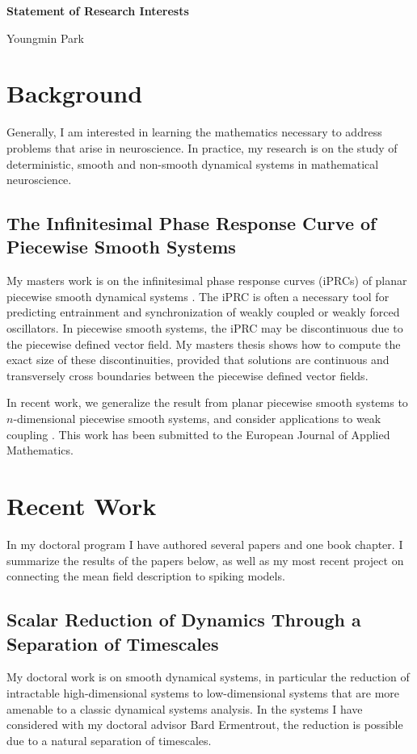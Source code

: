 \documentclass[a4paper,11pt]{article}
\begin{document}
\begin{center}
\Large \textbf{Statement of Research Interests}

\Large Youngmin Park
\end{center}


\section{Background}
Generally, I am interested in learning the mathematics necessary to address problems that arise in neuroscience. In practice, my research is on the study of deterministic, smooth and non-smooth dynamical systems in mathematical neuroscience.

\subsection{The Infinitesimal Phase Response Curve of Piecewise Smooth Systems}
My masters work is on the infinitesimal phase response curves (iPRCs) of planar piecewise smooth dynamical systems \cite{park2013infinitesimal}. The iPRC is often a necessary tool for predicting entrainment and synchronization of weakly coupled or weakly forced oscillators. In piecewise smooth systems, the iPRC may be discontinuous due to the piecewise defined vector field. My masters thesis shows how to compute the exact size of these discontinuities, provided that solutions are continuous and transversely cross boundaries between the piecewise defined vector fields.

In recent work, we generalize the result from planar piecewise smooth systems to $n$-dimensional piecewise smooth systems, and consider applications to weak coupling \cite{park2016infinitesimal}. This work has been submitted to the European Journal of Applied Mathematics.

\section{Recent Work}
In my doctoral program I have authored several papers and one book chapter. I summarize the results of the papers below, as well as my most recent project on connecting the mean field description to spiking models.

\subsection{Scalar Reduction of Dynamics Through a Separation of Timescales}
My doctoral work is on smooth dynamical systems, in particular the reduction of intractable high-dimensional systems to low-dimensional systems that are more amenable to a classic dynamical systems analysis. In the systems I have considered with my doctoral advisor Bard Ermentrout, the reduction is possible due to a natural separation of timescales.
\end{document}
